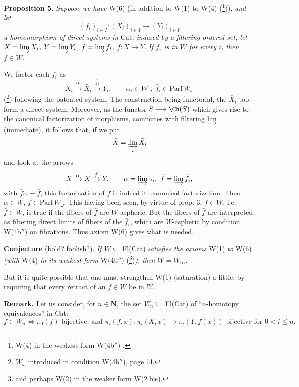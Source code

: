 \textbf{Proposition 5.} \textit{Suppose we have} W(6) (in addition to W(1) to W(4) (\footnote[34]{W(4) in the weakest form W(4b$''$) .})),
\textit{and let}
\[ (f_i)_{i\in I} : (X_i)_{i\in I} \longrightarrow (Y_i)_{i\in I} \]
\textit{a homomorphism of direct systems in} Cat\textit{, indexed by a filtering ordered set, let $X = \varinjlim X_i$, $Y = \varinjlim Y_i$, $f = \varinjlim f_i$, $f : X \longrightarrow Y$. If $f_i$ is in $W$ for every $i$, then $f \in W$.}

We factor each $f_i$ as
\[ X_i \xrightarrow{\alpha_i} \bar{X}_i \xrightarrow{\bar{f}_i} Y_i, \qquad \alpha_i \in W_\omega,\ \bar{f}_i \in \mathrm{Parf}\, W_\omega \]
(\footnote[35]{$W_\omega$ introduced in condition W(4b$''$), page 14.}) following the patented system. The construction being functorial, the $\bar{X}_i$ too form a direct system. Moreover, as the functor $S \longrightarrow \Ch(S)$ which gives rise to the canonical factorization of morphisms, commutes with filtering $\varinjlim$ (immediate), it follows that, if we put
\[ \bar{X} = \varinjlim_{i} \bar{X}_i \]
and look at the arrows
\[ X \xrightarrow{\alpha} \bar{X} \xrightarrow{\bar{f}} Y, \qquad \alpha = \varinjlim \alpha_i,\ \bar{f} = \varinjlim \bar{f}_i, \]
with $\bar{f}\alpha = \bar{f}$, this factorization of $f$ is indeed its canonical factorization. Thus $\alpha \in W$, %
$\bar{f} \in \mathrm{Parf}\, W_\omega$. This having been seen, by virtue of prop. 3, $f \in W$, i.e. $\bar{f} \in W$, is true if the fibers of $\bar{f}$ are $W$-aspheric. But the fibers of $\bar{f}$ are interpreted as filtering direct limits of fibers of the $\bar{f}_i$, which are $W$-aspheric by condition W(4b$''$) on fibrations. Thus axiom W(6) gives what is needed.

\textbf{Conjecture} (bold? foolish?). \textit{If $W \subseteq$} Fl(Cat) \textit{satisfies the axioms} W(1) \textit{to} W(6) \textit{(with} W(4) \textit{in its weakest form} W(4b$''$) (\footnote[36]{and perhaps W(2) in the weaker form W(2 bis).})\textit{), then $W = W_\infty$.}

But it is quite possible that one must strengthen W(1) (saturation) a little, by requiring that every retract of an $f \in W$ be in $W$.

\textbf{Remark.} Let us consider, for $n \in \mathbf{N}$, the set $W_n \subseteq$ Fl(Cat) of ``$n$-homotopy equivalences'' in Cat:
\[ f \in W_n \iff \pi_0(f) \text{ bijective, and } \pi_i(f, x) : \pi_i(X, x) \longrightarrow \pi_i(Y, f(x)) \text{ bijective for } 0 < i \leq n. \]

